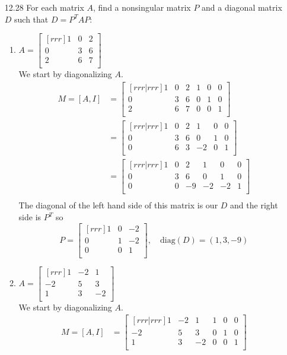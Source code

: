 \documentclass[12pt]{article}
\theoremstyle{definition}
\theoremstyle{plain}
\begin{document}
\begin{enumerate}
\item[12.28]For each matrix $A$, find a nonsingular matrix $P$ and a diagonal matrix $D$ such that $D=P^TAP$:
	\begin{enumerate}
	\item $A=\begin{bmatrix}[rrr]1&0&2\\0&3&6\\2&6&7\\\end{bmatrix}$\\
	We start by diagonalizing $A$.
	\begin{align*}
	M=[A,I]&= \begin{bmatrix}[rrr|rrr]1&0&2&1&0&0\\0&3&6&0&1&0\\2&6&7&0&0&1\\\end{bmatrix}\\
	&= \begin{bmatrix}[rrr|rrr]1&0&2&1&0&0\\0&3&6&0&1&0\\0&6&3&-2&0&1\\\end{bmatrix}\\
	&= \begin{bmatrix}[rrr|rrr]1&0&2&1&0&0\\0&3&6&0&1&0\\0&0&-9&-2&-2&1\\\end{bmatrix}\\
	\end{align*}
	The diagonal of the left hand side of this matrix is our $D$ and the right side is $P^T$ so 
	\[P=\begin{bmatrix}[rrr]1&0&-2\\0&1&-2\\0&0&1\\\end{bmatrix},\quad \mathrm{diag}(D)=(1,3,-9) \]
	\item $A=\begin{bmatrix}[rrr]1&-2&1\\-2&5&3\\1&3&-2\\\end{bmatrix}$\\
	We start by diagonalizing $A$.
	\begin{align*}
	M=[A,I]&=\begin{bmatrix}[rrr|rrr]1&-2&1&1&0&0\\-2&5&3&0&1&0\\1&3&-2&0&0&1\\\end{bmatrix}\\

\end{align*}
\end{enumerate}
\end{enumerate}
\end{document}
